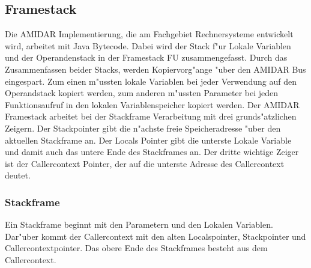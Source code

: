 \subsection{Framestack}
Die AMIDAR Implementierung, die am Fachgebiet Rechnersysteme entwickelt wird, arbeitet mit Java Bytecode. Dabei wird der Stack f"ur Lokale Variablen und der Operandenstack in der Framestack FU zusammengefasst. Durch das Zusammenfassen beider Stacks, werden Kopiervorg"ange "uber den AMIDAR Bus eingespart. Zum einen m"ussten lokale Variablen bei jeder Verwendung auf den Operandstack kopiert werden, zum anderen m"ussten Parameter bei jeden Funktionsaufruf in den lokalen Variablenspeicher kopiert werden.
Der AMIDAR Framestack arbeitet bei der Stackframe Verarbeitung mit drei grunds"atzlichen Zeigern. Der Stackpointer gibt die n"achste freie Speicheradresse "uber den aktuellen Stackframe an. Der Locals Pointer gibt die unterste Lokale Variable und damit auch das untere Ende des Stackframes an. Der dritte wichtige Zeiger ist der Callercontext Pointer, der auf die unterste Adresse des Callercontext deutet. \cite{Illy}

\subsubsection{Stackframe}
Ein Stackframe beginnt mit den Parametern und den Lokalen Variablen.  Dar"uber kommt der Callercontext mit den alten Localspointer, Stackpointer und Callercontextpointer. Das obere Ende des Stackframes besteht aus dem Callercontext. 
\cite{Illy}


